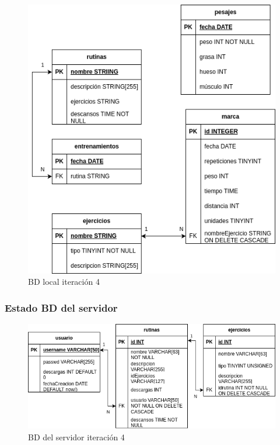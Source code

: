 \begin{figure}[H]
    \centering
    \includegraphics[width=\textwidth]{fotos/BDL iteracion 4.png}
    \caption{BD local iteración 4}
    \label{fig:BDL iteracion 4}
\end{figure}

\subsubsection{Estado BD del servidor}

\begin{figure}[H]
    \centering
    \includegraphics[width=\textwidth]{fotos/BD be iteracion 4.png}
    \caption{BD del servidor iteración 4}
    \label{fig:BD be iteracion 4}
\end{figure}

